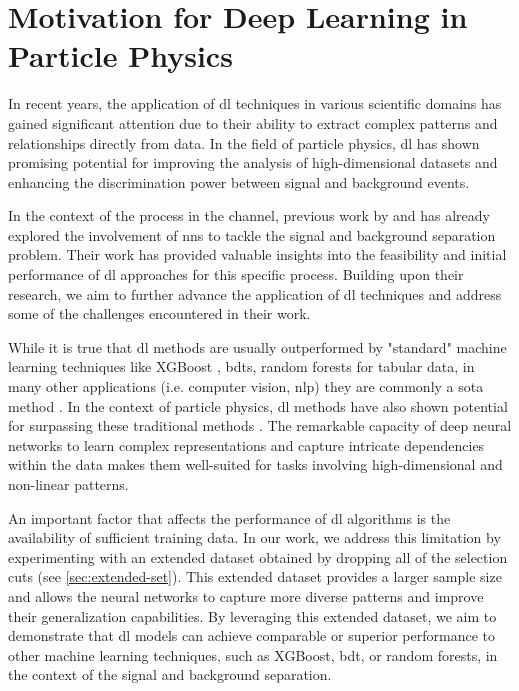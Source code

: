 \section*{Motivation for Deep Learning in Particle Physics}

In recent years, the application of \gls{dl} techniques in various scientific domains has gained significant
attention due to their ability to extract complex patterns and relationships directly from data. In the field of
particle physics, \gls{dl} has shown promising potential for improving the analysis of high-dimensional datasets
and enhancing the discrimination power between signal and background events.

In the context of the \tth process in the \lss channel, previous work by \cite{severin} and \cite{jan} has already
explored the involvement of \glspl{nn} to tackle the signal and background separation problem. Their work has
provided valuable insights into the feasibility and initial performance of \gls{dl} approaches for this specific
process. Building upon their research, we aim to further advance the application of \gls{dl} techniques and address
some of the challenges encountered in their work.

While it is true that \gls{dl} methods are usually outperformed \cite{tabular} by "standard" machine learning techniques
like XGBoost \cite{xgboost}, \glspl{bdt}, random forests \cite{random-forrest} for tabular data, in many other
applications (i.e. computer vision, \gls{nlp}) they are commonly a \gls{sota} method
\cite{gpt4-technical,gpt4-sparks,diffusion}. %
In the context of particle physics, \gls{dl} methods have also shown potential for surpassing these traditional methods
\cite{jet-rnn}.  The remarkable capacity of deep neural networks to learn complex representations and capture intricate
dependencies within the data makes them well-suited for tasks involving high-dimensional and non-linear patterns.

An important factor that affects the performance of \gls{dl} algorithms is the availability of sufficient training data.
In our work, we address this limitation by experimenting with an extended dataset obtained by dropping all of the
selection cuts (see \autoref{sec:extended-set}). This extended dataset provides a larger sample size and allows the
neural networks to capture more diverse patterns and improve their generalization capabilities. By leveraging this
extended dataset, we aim to demonstrate that \gls{dl} models can achieve comparable or superior performance to other
machine learning techniques, such as XGBoost, \gls{bdt}, or random forests, in the context of the \tth signal and
background separation.

